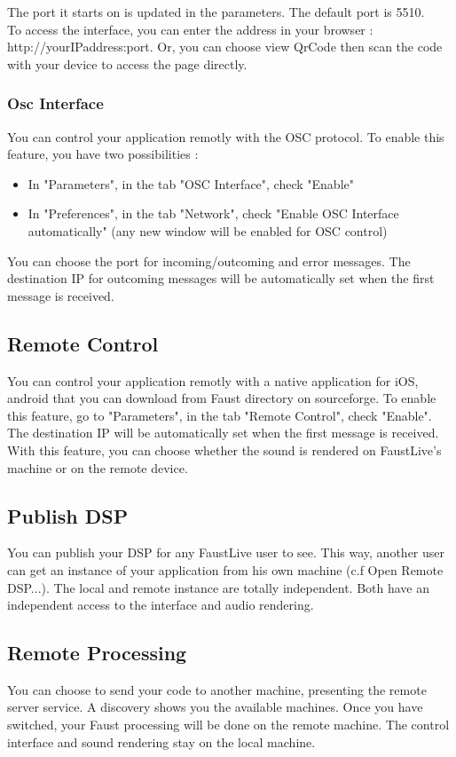 \documentclass[a4paper]{article}
\begin{document}
The port it starts on is updated in the parameters. The default port is 5510.\\
	To access the interface, you can enter the address in your browser : http://yourIPaddress:port.	
	Or, you can choose view QrCode then scan the code with your device to access the page directly. 

\subsubsection{Osc Interface}
	You can control your application remotly with the OSC protocol. 
	To enable this feature, you have two possibilities :
	\begin{itemize}
	\item In "Parameters", in the tab "OSC Interface", check "Enable"
	\item In "Preferences", in the tab "Network", check "Enable OSC Interface automatically" (any new window will be enabled for OSC control)
	\end{itemize}
	You can choose the port for incoming/outcoming and error messages. The destination IP for outcoming messages will be automatically set when the first message is received. 

\subsection{Remote Control}
You can control your application remotly with a native application for iOS, android that you can download from Faust directory on sourceforge.  To enable this feature, go to "Parameters", in the tab "Remote Control", check "Enable". The destination IP will be automatically set when the first message is received. \\

With this feature, you can choose whether the sound is rendered on FaustLive's machine or on the remote device. 

\subsection{Publish DSP}
You can publish your DSP for any FaustLive user to see. This way, another user can get an instance of your application from his own machine (c.f Open Remote DSP...). The local and remote instance are totally independent. Both have an independent access to the interface and audio rendering.

\subsection{Remote Processing}
You can choose to send your code to another machine, presenting the remote server service. A discovery shows you the available machines. Once you have switched, your Faust processing will be done on the remote machine. The control interface and sound rendering stay on the local machine.
\end{document}
